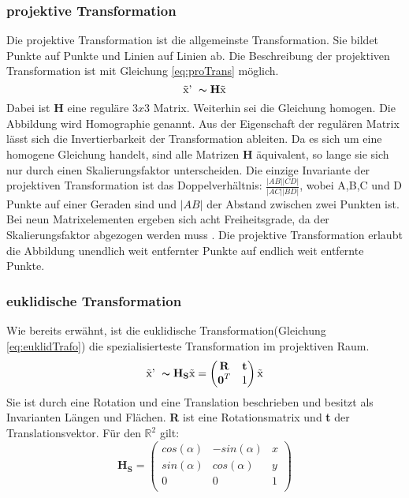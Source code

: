 \subsubsection{projektive Transformation}

Die projektive Transformation ist die allgemeinste Transformation. Sie bildet Punkte auf Punkte und Linien auf Linien ab. Die Beschreibung der projektiven Transformation ist mit Gleichung \ref{eq:proTrans} m\"oglich.
\begin{equation}
\text{\~{x}' }\thicksim \textbf{H} \text{\~{x}}
\label{eq:proTrans}
\end{equation}
Dabei ist \textbf{H} eine regul\"are $3x3$ Matrix. Weiterhin sei die Gleichung homogen. Die Abbildung wird Homographie genannt. Aus der Eigenschaft der regul\"aren Matrix l\"asst sich die Invertierbarkeit der Transformation ableiten. Da es sich um eine homogene Gleichung handelt, sind alle Matrizen \textbf{H} \"aquivalent, so lange sie sich nur durch einen Skalierungsfaktor unterscheiden. Die einzige Invariante der projektiven Transformation ist das Doppelverh\"altnis: $\frac{|AB||CD|}{|AC||BD|}$, wobei A,B,C und D Punkte auf einer Geraden sind und $|AB|$ der Abstand zwischen zwei Punkten ist. Bei neun Matrixelementen ergeben sich acht Freiheitsgrade, da der Skalierungsfaktor abgezogen werden muss \cite{Rahmann2011}. Die projektive Transformation erlaubt die Abbildung unendlich weit entfernter Punkte auf endlich weit entfernte Punkte.
\subsubsection{euklidische Transformation}
Wie bereits erw\"ahnt, ist die euklidische Transformation(Gleichung \ref{eq:euklidTrafo}) die spezialisierteste Transformation im projektiven Raum. 
\begin{equation}
\text{\~{x}' }\thicksim \textbf{H}_\textbf{S} \text{\~{x}}
 = 
\begin{pmatrix}
\textbf{R} & \textbf{t} \\
\textbf{0}^T & 1 \\
\end{pmatrix}
\text{\~{x}}
\label{eq:euklidTrafo}
\end{equation}
Sie ist durch eine Rotation und eine Translation beschrieben und besitzt als Invarianten Längen und Flächen\cite{Rahmann2011}. \textbf{R} ist eine  Rotationsmatrix und \textbf{t} der Translationsvektor. F\"ur den ${\mathbb{R}}^{2}$ gilt:
\begin{equation}
\textbf{H}_\textbf{S}
 = 
\begin{pmatrix}
cos(\alpha) & -sin(\alpha) & x \\
sin(\alpha) & cos(\alpha) & y \\
0 & 0  & 1 \\
\end{pmatrix}
\label{eq:Hs}
\end{equation} 

